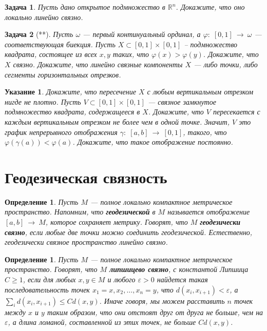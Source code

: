 \documentclass[12pt]{book}
\newcommand{\subs}{\section}
\newcommand{\arrow}{{\:\longrightarrow\:}}
\renewcommand{\phi}{\varphi}
\renewcommand{\epsilon}{\varepsilon}
\def\R{{\mathbb R}}
\theoremstyle{upshape}
\newtheorem{zadacha}{Задача}[chapter]
\theoremstyle{generic}
\newtheorem{opredelenie}[teorema]{Определение}
\theoremstyle{upshapenonumber}
\newtheorem{ukazanie}{Указание}[section]
\newcommand{\следствие}{%
     \refstepcounter{teorema}
     {\noindent\bf Следствие \thechapter.\arabic{teorema}:\ }}
\newcommand{\пример}{%
     \refstepcounter{teorema}
     {\noindent\bf Пример \thechapter.\arabic{teorema}:\ }}
\newcommand{\лемма}{%
     \refstepcounter{teorema}
     {\noindent\bf Лемма \thechapter.\arabic{teorema}:\ }}
\newcommand{\теорема}{%
     \refstepcounter{teorema}
     {\noindent\bf Теорема \thechapter.\arabic{teorema}:\ }}
\newcommand{\утверждение}{%
     \refstepcounter{teorema}
     {\noindent\bf Утверждение \thechapter.\arabic{teorema}:\ }}
\begin{document}
{\begin{zadacha}
Пусть дано открытое подмножество в $\R^n$. Докажите, что оно
локально линейно связно.
\end{zadacha}

\begin{zadacha}[**]
Пусть $\omega$ --- первый континуальный ординал,
а $\phi:\; [0,1] \arrow \omega$ --- соответствующая биекция.
Пусть $X \subset [0,1]\times [0,1]$ --
подмножество квадрата, состоящее из всех
$x,y$ таких, что $\phi(x) > \phi(y)$.
Докажите, что $X$ связно. Докажите, что
линейно связные компоненты $X$ --- либо
точки, либо сегменты горизонтальных 
отрезков.
\end{zadacha}

\begin{ukazanie}
Докажите, что пересечение $X$ с любым
вертикальным отрезком нигде не плотно. 
Пусть $V\subset [0,1]\times [0,1]$ --- связное
замкнутое подмножество квадрата, содержащееся 
в $X$. Докажите, что $V$ пересекается с каждым вертикальным 
отрезком не более чем в одной точке. 
Значит, $V$ это график непрерывного отображения
$\gamma:\; [a,b] \arrow [0,1]$,
такого, что $\phi(\gamma(a))< \phi(a)$.
Докажите, что такое отображение постоянно.
\end{ukazanie}

\subs{Геодезическая связность}

\begin{opredelenie}
Пусть $M$ --- полное локально компактное
метрическое пространство. Напомним, что 
{\bf геодезической} в $M$ называется
отображение $[a, b] \arrow M$, которое
сохраняет метрику. Говорят, что $M$ {\bf геодезически
связно}, если любые две точки можно соединить
геодезической. Естественно, геодезически
связное пространство линейно связно.
\end{opredelenie}

\begin{opredelenie}
Пусть $M$ --- полное локально компактное
метрическое пространство. Говорят, что $M$
{\bf липшицево связно}, с константой Липшица $C\geq 1$,
если для любых $x, y \in M$ и любого $\epsilon >0$
найдется такая последовательность точек $x_1=x, x_2,\dots, x_n=y$, что 
$d(x_i, x_{i+1})< \epsilon$, а 
$\sum_i d(x_i, x_{i+1}) \leq C d(x,y)$.
Иначе говоря, мы можем расставить $n$ точек
между $x$ и $y$ таким образом, что они отстоят
друг от друга не больше, чем на $\epsilon$,
а длина ломаной, составленной из этих 
точек, не больше $C d(x,y)$.
\end{opredelenie}

}
\end{document}
